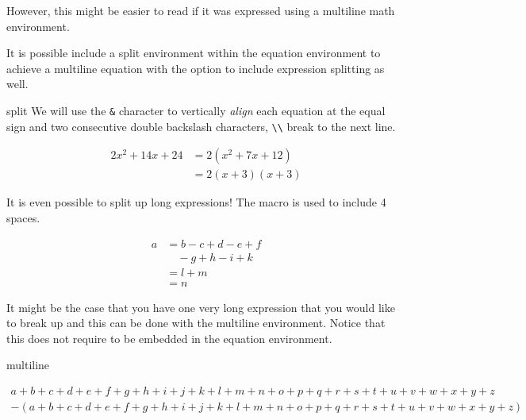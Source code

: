 However, this might be easier to read if it was expressed using a multiline math environment.

It is possible include a split environment within the equation environment to achieve a
multiline equation with the option to include expression splitting as well.
\begin{docEnvironment*}[doclang/environment content=mathematics content goes here]{split}{}{}
  We will use the \verb!&! character to vertically \textit{align} each equation
  at the equal sign and two consecutive double backslash characters, \verb!\\! 
  break to the next line.
  \begin{dispExample}
    \begin{equation*}
      \begin{split}
        2x^2 + 14x + 24 
        &= 2( x^2 + 7x + 12 ) \\
        &= 2(x + 3)(x + 3) 
      \end{split}
    \end{equation*}
    \end{dispExample}
    It is even possible to split up long expressions!  The  macro is 
    used to include 4 spaces.
    \begin{dispExample}
      \begin{equation*}
        \begin{split}
          a
          &= b - c + d - e + f \\
          & \quad - g + h - i + k \\
          &= l + m \\
          &= n 
        \end{split}
      \end{equation*}
      \end{dispExample}
\end{docEnvironment*}
It might be the case that you have one very long expression that you would like 
to break up and this can be done with the multiline environment.  Notice that 
this does not require to be embedded in the equation environment.
\begin{docEnvironment*}[doclang/environment content=mathematics content goes here]{multiline}{}{}
  \begin{dispExample}
    \begin{multline*}
        a + b + c + d + e + f + g + h + i + j + k + l + m + n + o + p + q + r + s + t + u + v + w + x + y + z \\
        - (a + b + c + d + e + f + g + h + i + j + k + l + m + n + o + p + q + r + s + t + u + v + w + x + y + z ) 
    \end{multline*}
    \end{dispExample}
\end{docEnvironment*}
